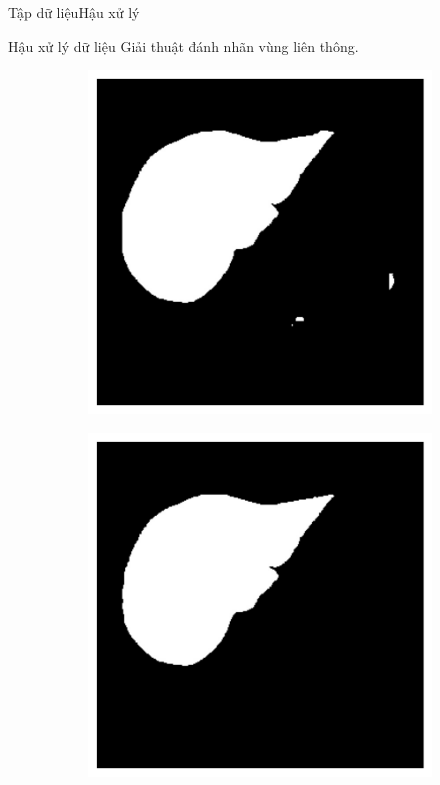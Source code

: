 \documentclass[
	10pt,                %
	aspectratio=169,     %
]{beamer}
\begin{document}
	\begin{frame}{Tập dữ liệu}{Hậu xử lý}
		\vspace{5mm}
		\begin{block}{Hậu xử lý dữ liệu}
		Giải thuật đánh nhãn vùng liên thông.
		\end{block}
		\begin{figure}[h!]
		    \hspace{8mm}
			\begin{subfigure}[b]{0.3\textwidth}
				\includegraphics[height=.4\textheight]{figures/liver_post_processing_before}
				\caption{}
				\label{fig:post_processing_before}
			\end{subfigure}
			\begin{subfigure}[b]{0.3\textwidth}
				\includegraphics[height=.4\textheight]{figures/liver_post_processing_after}

\end{subfigure}
\end{figure}
\end{frame}
\end{document}
